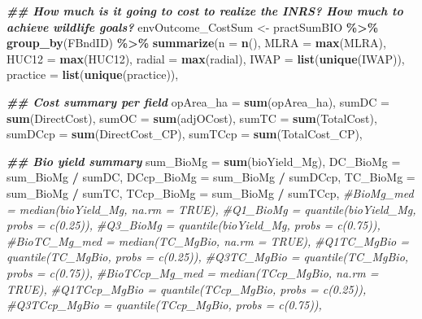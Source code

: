 \documentclass[
]{article}
\newenvironment{Shaded}{\begin{snugshade}}{\end{snugshade}}
\newcommand{\AttributeTok}[1]{\textcolor[rgb]{0.13,0.29,0.53}{#1}}
\newcommand{\CommentTok}[1]{\textcolor[rgb]{0.56,0.35,0.01}{\textit{#1}}}
\newcommand{\DocumentationTok}[1]{\textcolor[rgb]{0.56,0.35,0.01}{\textbf{\textit{#1}}}}
\newcommand{\FunctionTok}[1]{\textcolor[rgb]{0.13,0.29,0.53}{\textbf{#1}}}
\newcommand{\NormalTok}[1]{#1}
\newcommand{\OtherTok}[1]{\textcolor[rgb]{0.56,0.35,0.01}{#1}}
\newcommand{\SpecialCharTok}[1]{\textcolor[rgb]{0.81,0.36,0.00}{\textbf{#1}}}
\begin{document}
\begin{Shaded}
\begin{Highlighting}[]
\DocumentationTok{\#\# How much is it going to cost to realize the INRS? How much to achieve wildlife goals?}
\NormalTok{envOutcome\_CostSum }\OtherTok{\textless{}{-}}\NormalTok{ practSumBIO }\SpecialCharTok{\%\textgreater{}\%}
  \FunctionTok{group\_by}\NormalTok{(FBndID) }\SpecialCharTok{\%\textgreater{}\%}
  \FunctionTok{summarize}\NormalTok{(}\AttributeTok{n       =} \FunctionTok{n}\NormalTok{(),}
            \AttributeTok{MLRA =} \FunctionTok{max}\NormalTok{(MLRA),}
            \AttributeTok{HUC12 =} \FunctionTok{max}\NormalTok{(HUC12),}
            \AttributeTok{radial =} \FunctionTok{max}\NormalTok{(radial),}
            \AttributeTok{IWAP =} \FunctionTok{list}\NormalTok{(}\FunctionTok{unique}\NormalTok{(IWAP)),}
            \AttributeTok{practice =} \FunctionTok{list}\NormalTok{(}\FunctionTok{unique}\NormalTok{(practice)),}
            
            \DocumentationTok{\#\# Cost summary per field}
            \AttributeTok{opArea\_ha =} \FunctionTok{sum}\NormalTok{(opArea\_ha),}
            \AttributeTok{sumDC =} \FunctionTok{sum}\NormalTok{(DirectCost),}
            \AttributeTok{sumOC =} \FunctionTok{sum}\NormalTok{(adjOCost),}
            \AttributeTok{sumTC =} \FunctionTok{sum}\NormalTok{(TotalCost),}
            \AttributeTok{sumDCcp =} \FunctionTok{sum}\NormalTok{(DirectCost\_CP),}
            \AttributeTok{sumTCcp =} \FunctionTok{sum}\NormalTok{(TotalCost\_CP),}
            
            \DocumentationTok{\#\# Bio yield summary}
            \AttributeTok{sum\_BioMg =} \FunctionTok{sum}\NormalTok{(bioYield\_Mg),}
            \AttributeTok{DC\_BioMg =}\NormalTok{ sum\_BioMg }\SpecialCharTok{/}\NormalTok{ sumDC,}
            \AttributeTok{DCcp\_BioMg =}\NormalTok{ sum\_BioMg }\SpecialCharTok{/}\NormalTok{ sumDCcp,}
            \AttributeTok{TC\_BioMg =}\NormalTok{ sum\_BioMg }\SpecialCharTok{/}\NormalTok{ sumTC,}
            \AttributeTok{TCcp\_BioMg =}\NormalTok{ sum\_BioMg }\SpecialCharTok{/}\NormalTok{ sumTCcp,}
            \CommentTok{\#BioMg\_med = median(bioYield\_Mg, na.rm = TRUE),}
            \CommentTok{\#Q1\_BioMg = quantile(bioYield\_Mg, probs = c(0.25)),}
            \CommentTok{\#Q3\_BioMg = quantile(bioYield\_Mg, probs = c(0.75)),}
            \CommentTok{\#BioTC\_Mg\_med = median(TC\_MgBio, na.rm = TRUE),}
            \CommentTok{\#Q1TC\_MgBio = quantile(TC\_MgBio, probs = c(0.25)),}
            \CommentTok{\#Q3TC\_MgBio = quantile(TC\_MgBio, probs = c(0.75)),}
            \CommentTok{\#BioTCcp\_Mg\_med = median(TCcp\_MgBio, na.rm = TRUE),}
            \CommentTok{\#Q1TCcp\_MgBio = quantile(TCcp\_MgBio, probs = c(0.25)),}
            \CommentTok{\#Q3TCcp\_MgBio = quantile(TCcp\_MgBio, probs = c(0.75)),}
            

\end{Highlighting}
\end{Shaded}
\end{document}
